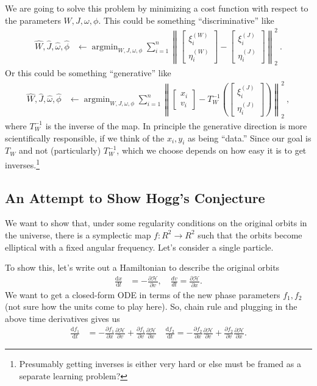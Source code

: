 \documentclass{article}
\newcommand{\dd}{\mathrm{d}}
\DeclareMathOperator*{\argmin}{argmin}
\newcommand{\norm}[1]{\left\lVert#1\right\rVert_2^2}
\begin{document}
We are going to solve this problem by minimizing a cost function with respect to the parameters $W,J,\omega,\phi$.
This could be something ``discriminative'' like
\begin{align}
    \hat{W},\hat{J},\hat{\omega},\hat{\phi} &\leftarrow \argmin_{W,J,\omega,\phi} \sum_{i=1}^n\norm{\begin{bmatrix}\xi^{(W)}_i \\ \eta^{(W)}_i\end{bmatrix} - \begin{bmatrix}\xi^{(J)}_i \\ \eta^{(J)}_i\end{bmatrix}} ~.
\end{align}
Or this could be something ``generative'' like
\begin{align}
    \hat{W},\hat{J},\hat{\omega},\hat{\phi} &\leftarrow \argmin_{W,J,\omega,\phi} \sum_{i=1}^n\norm{\begin{bmatrix}x_i \\ v_i\end{bmatrix} - T_W^{-1}(\begin{bmatrix}\xi^{(J)}_i \\ \eta^{(J)}_i\end{bmatrix})} ~,
\end{align}
where $T_W^{-1}$ is the inverse of the map.
In principle the generative direction is more scientifically responsible, if we think of the $x_i, y_i$ as being ``data.''
Since our goal is $T_W$ and not (particularly) $T_W^{-1}$, which we choose depends on how easy it is to get inverses.\footnote{Presumably getting inverses is either very hard or else must be framed as a separate learning problem?}

\subsection{An Attempt to Show Hogg's Conjecture}

We want to show that, under some regularity conditions on the original orbits in the universe, there is a symplectic map $f : R^2 \to R^2$ such that the orbits become elliptical with a fixed angular frequency. 
Let's consider a single particle. 

To show this, let's write out a Hamiltonian to describe the original orbits
\begin{align}
    \frac{\dd x}{\dd t} &= - \frac{\partial \mathcal{H}}{\partial v}, \quad \frac{d v}{dt} = \frac{\partial \mathcal{H}}{\partial x}. 
\end{align}
We want to get a closed-form ODE in terms of the new phase parameters $f_1, f_2$ (not sure how the units come to play here). So, chain rule and plugging in the above time derivatives gives us 
\begin{align}
    \frac{\dd f_1}{\dd t} &= - \frac{\partial f_1}{\partial x} \frac{\partial \mathcal{H}}{\partial v} + \frac{\partial f_1}{\partial v} \frac{\partial \mathcal{H}}{\partial x} \quad
    \frac{\dd f_2}{\dd t} = - \frac{\partial f_2}{\partial x} \frac{\partial \mathcal{H}}{\partial v} + \frac{\partial f_2}{\partial v} \frac{\partial \mathcal{H}}{\partial x}.
\end{align}
\end{document}
